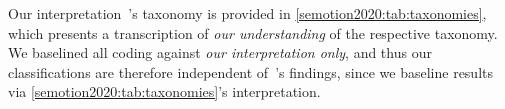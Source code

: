 Our interpretation~\citeauthor{Beyer:2018fm}'s taxonomy is provided in \cref{semotion2020:tab:taxonomies}, which presents a transcription of \textit{our understanding} of the respective taxonomy. We baselined all coding against \textit{our interpretation only}, and thus our classifications are therefore independent of~\citeauthor{Beyer:2018fm}'s findings, since we baseline results via \cref{semotion2020:tab:taxonomies}'s interpretation.





